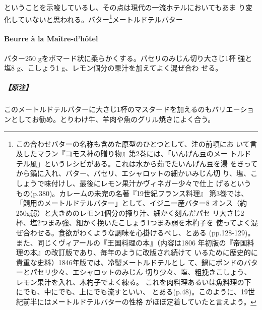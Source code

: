 \begin{recette}
{{{{  ということを示唆しているし、その点は現代の一流ホテルにおいてもあま
  り変化していないと思われる。}バター\footnote{この合わせバターの名称も含めた原型のひとつとして、注の前項にお
  いて言及したマラン『コモス神の贈り物』第2巻には、「いんげん豆のメー
  トルドテル風」というレシピがある。これは水から茹でたいんげん豆を湯
  をきってから鍋に入れ、バター、パセリ、エシャロットの細かいみじん切
  り、塩、こしょうで味付けし、最後にレモン果汁かヴィネガー少々で仕上
  げるというもの(p.380)。カレームの未完の名著『19世紀フランス料理』
  第3巻では、「鯖用のメートルドテルバター」として、イジニー産バター8
  オンス（約250g弱）と大きめのレモン1個分の搾り汁、細かく刻んだパセ
  リ大さじ2杯、塩2つまみ強、細かく挽いたこしょう1つまみ弱を木杓子を
  使ってよく混ぜ合わせる。食欲がわくような調味を心掛けるべし、とある
  (pp.128-129)。また、同じくヴィアールの『王国料理の本』（内容は1806
  年初版の『帝国料理の本』の改訂版であり、毎年のように改版され続けて
  いるために歴史的に貴重な史料）1846年版では、冷製メートルドテルとし
  て、鍋に\unquart{}ポンドのバターとパセリ少々、エシャロットのみじん
  切り少々、塩、粗挽きこしょう、レモン果汁を入れ、木杓子でよく練る。
  これを肉料理あるいは魚料理の下にでも、中にでも、上にでも流すといい、
  とある(p.48)。このように、19世紀前半にはメートルドテルバターの性格
  がほぼ定着していたと言えよう。}}{メートルドテルバター}}\label{ux30e1ux30fcux30c8ux30ebux30c9ux30c6ux30eb25ux30d0ux30bfux30fc26}}

\hypertarget{beurre-a-la-maitre-d-hotel}{%
\paragraph{Beurre à la
Maître-d'hôtel}\label{beurre-a-la-maitre-d-hotel}}


バター250 gをポマード状に柔らかくする。パセリのみじん切り大さじ1杯
強と塩8 g、こしょう1 g、レモン\unquart{}個分の果汁を加えてよく混ぜ合わ
せる。

\hypertarget{ux539fux6ce8-2}{%
\subparagraph{【原注】}\label{ux539fux6ce8-2}}

このメートルドテルバターに大さじ1杯のマスタードを加えるのもバリエーショ
ンとしてお勧め。とりわけ牛、羊肉や魚のグリル焼きによく合う。


\end{recette}
